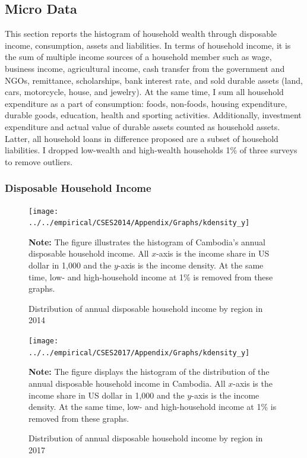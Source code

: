 \documentclass[11pt,letterpaper]{article}
\begin{document}
\subsection{Micro Data}
This section reports the histogram of household wealth through disposable income, consumption, assets and liabilities. In terms of household income, it is the sum of multiple income sources of a household member such as wage, business income, agricultural income, cash transfer from the government and NGOs,  remittance, scholarships, bank interest rate, and sold durable assets (land, cars, motorcycle, house, and jewelry). At the same time, I sum all household expenditure as a part of consumption: foods, non-foods, housing expenditure, durable goods, education, health and sporting activities. Additionally, investment expenditure and actual value of durable assets counted as household assets. Latter, all household loans in difference proposed are a subset of household liabilities. I dropped low-wealth and high-wealth households 1\% of three surveys to remove outliers.

\subsubsection{Disposable Household Income}
\begin{figure}[h!]
	\centering
	\caption{Distribution of annual disposable household income by region in 2014}
	\label{}
	\vspace{-1em}
	\texttt{[image: ../../empirical/CSES2014/Appendix/Graphs/kdensity\_y]}
	\begin{tablenotes}
		\footnotesize
		\item \textbf{Note:} The figure illustrates the histogram of Cambodia's annual disposable household income. All $x$-axis is the income share in US dollar in 1,000 and the $y$-axis is the income density. At the same time, low- and high-household income at 1\% is removed from these graphs. 
		
	\end{tablenotes} 
\end{figure}

\begin{figure}
	\centering
	\caption{Distribution of annual disposable household income by region in 2017}
	\label{}
	\texttt{[image: ../../empirical/CSES2017/Appendix/Graphs/kdensity\_y]}
	\begin{tablenotes}
		\footnotesize
		\item \textbf{Note:} The figure displays the histogram of the distribution of the annual disposable household income in Cambodia. All $x$-axis is the income share in US dollar in 1,000 and the $y$-axis is the income density. At the same time, low- and high-household income  at 1\% is removed from these graphs. 
	\end{tablenotes} 
\end{figure}
\end{document}
